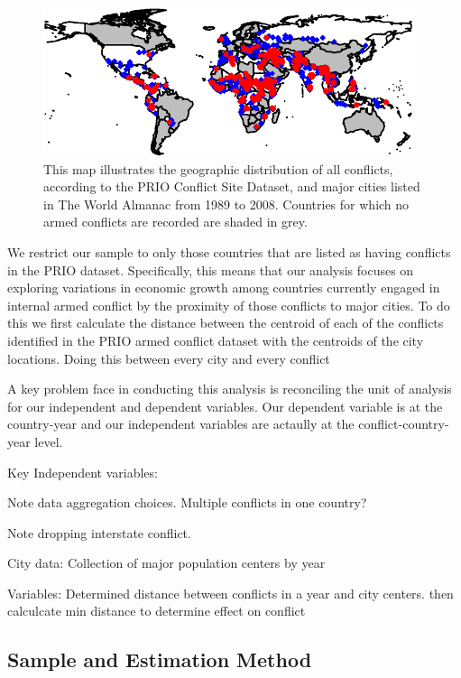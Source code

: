 \begin{figure}[ht]
	\centering
	\includegraphics[width=.9\textwidth]{CityConfMap-crop}
	\caption{This map illustrates the geographic distribution of all conflicts, according to the PRIO Conflict Site Dataset, and major cities listed in The World Almanac from 1989 to 2008. Countries for which no armed conflicts are recorded are shaded in grey.}
	\label{fig:CityConfMap}
\end{figure}

We restrict our sample to only those countries that are listed as having conflicts in the PRIO dataset. Specifically, this means that our analysis focuses on exploring variations in economic growth among countries currently engaged in internal armed conflict by the proximity of those conflicts to major cities. To do this we first calculate the distance between the centroid of each of the conflicts identified in the PRIO armed conflict dataset with the centroids of the city locations. Doing this between every city and every conflict 

A key problem face in conducting this analysis is reconciling the unit of analysis for our independent and dependent variables. Our dependent variable is at the country-year and our independent variables are actaully at the conflict-country-year level. 


Key Independent variables: 

		Note data aggregation choices.  Multiple conflicts in one country?

		Note dropping interstate conflict.

	City data: Collection of major population centers by year 

	Variables: Determined distance between conflicts in a year and city centers. then calculcate min distance to determine effect on conflict 

\subsection{Sample and Estimation Method}

